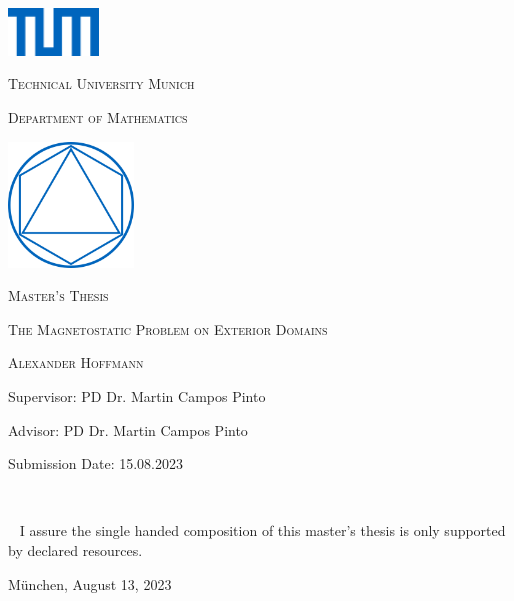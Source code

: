 \documentclass[12pt,a4paper,times]{report}
\numberwithin{equation}{section}
\numberwithin{figure}{section}
\numberwithin{lemma}{section}
\theoremstyle{definition}
\begin{document}
\begin{titlepage}
    \begin{center}
    \includegraphics[width=0.18\textwidth]{img/tum.png}\par
    \vspace{0.5cm}
    {\scshape\LARGE Technical University Munich \par}
    \vspace{0.5cm}
    {\scshape \Large Department of Mathematics\par}
    \vspace{1cm}
	\includegraphics[width=0.25\textwidth]{img/ma_tum.png}\par
    \vspace{0.5cm}
    {\scshape \LARGE Master's Thesis \par}
    \vspace{0.6cm}
   {\Huge \scshape The Magnetostatic Problem on Exterior Domains \par}
   \vspace{0.7cm}
   
   {\scshape \Large Alexander Hoffmann\par}
   

	\end{center}
	\vfill
    Supervisor: PD Dr. Martin Campos Pinto
    \medskip
    
    \noindent Advisor: PD Dr. Martin Campos Pinto
    \medskip
    
    \noindent Submission Date: 15.08.2023
    \vspace{1cm}
\end{titlepage}
\
\thispagestyle{empty}
\newpage

\ {}
\vfill
\thispagestyle{empty}
\noindent I assure the single handed composition of this master's thesis is only supported by declared resources.
\bigskip

\noindent München, August 13, 2023 \par
\vspace{2,5cm}
 
\end{document}
